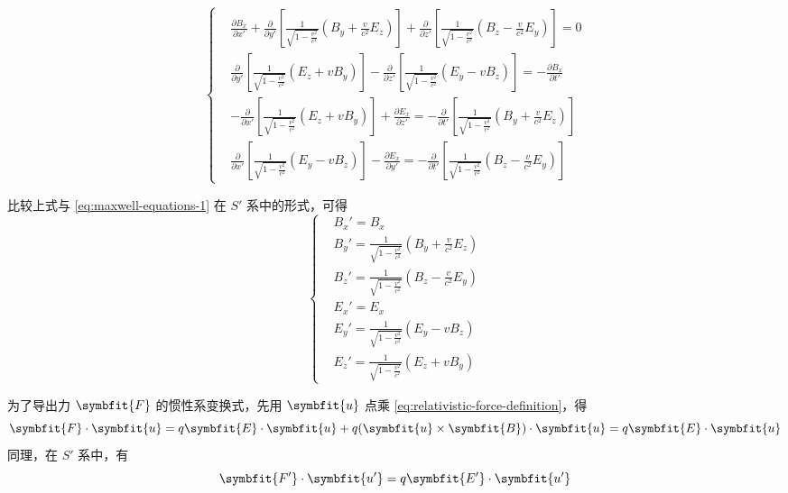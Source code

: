 \begin{equation}
    \left\{
    \begin{aligned}
         & \frac{\partial B_x}{\partial x'} + \frac{\partial}{\partial y'} \left[ \frac{1}{\sqrt{1 - \frac{v^2}{c^2}}} (B_y + \frac{v}{c^2} E_z) \right] + \frac{\partial}{\partial z'} \left[ \frac{1}{\sqrt{1 - \frac{v^2}{c^2}}} (B_z - \frac{v}{c^2} E_y) \right] = 0 \\
         & \frac{\partial}{\partial y'} \left[ \frac{1}{\sqrt{1 - \frac{v^2}{c^2}}} (E_z + v B_y) \right] - \frac{\partial}{\partial z'} \left[ \frac{1}{\sqrt{1 - \frac{v^2}{c^2}}} (E_y - v B_z) \right] = - \frac{\partial B_x}{\partial t'}                           \\
         & - \frac{\partial}{\partial x'} \left[ \frac{1}{\sqrt{1 - \frac{v^2}{c^2}}} (E_z + v B_y) \right] + \frac{\partial E_x}{\partial z'} = - \frac{\partial}{\partial t'} \left[ \frac{1}{\sqrt{1 - \frac{v^2}{c^2}}} (B_y + \frac{v}{c^2} E_z) \right]             \\
         & \frac{\partial}{\partial x'} \left[ \frac{1}{\sqrt{1 - \frac{v^2}{c^2}}} (E_y - v B_z) \right] - \frac{\partial E_x}{\partial y'} = - \frac{\partial}{\partial t'} \left[ \frac{1}{\sqrt{1 - \frac{v^2}{c^2}}} (B_z - \frac{v}{c^2} E_y) \right]
    \end{aligned}
    \right.
\end{equation}

比较上式与 \cref{eq:maxwell-equations-1} 在 $S'$ 系中的形式，可得
\begin{equation}
    \left\{
    \begin{aligned}
         & B_x' = B_x                                                            \\
         & B_y' = \frac{1}{\sqrt{1 - \frac{v^2}{c^2}}} (B_y + \frac{v}{c^2} E_z) \\
         & B_z' = \frac{1}{\sqrt{1 - \frac{v^2}{c^2}}} (B_z - \frac{v}{c^2} E_y) \\
         & E_x' = E_x                                                            \\
         & E_y' = \frac{1}{\sqrt{1 - \frac{v^2}{c^2}}} (E_y - v B_z)             \\
         & E_z' = \frac{1}{\sqrt{1 - \frac{v^2}{c^2}}} (E_z + v B_y)
    \end{aligned}
    \right.
\end{equation}

\medskip

为了导出力 $\symbfit{F}$ 的惯性系变换式，先用 $\symbfit{u}$ 点乘 \cref{eq:relativistic-force-definition}，得
\begin{equation}
    \symbfit{F} \cdot \symbfit{u} = q \symbfit{E} \cdot \symbfit{u} + q (\symbfit{u} \times \symbfit{B}) \cdot \symbfit{u} = q \symbfit{E} \cdot \symbfit{u}
\end{equation}
同理，在 $S'$ 系中，有
\begin{equation}
    \symbfit{F'} \cdot \symbfit{u'} = q \symbfit{E'} \cdot \symbfit{u'}
\end{equation}

